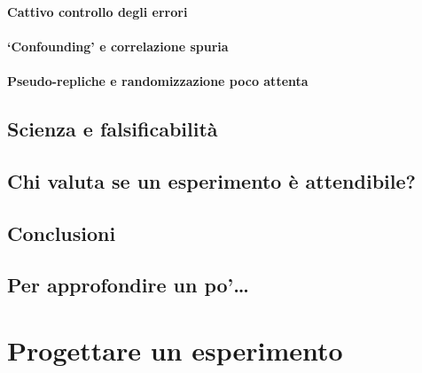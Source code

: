 \documentclass[a4paper,12pt,oneside]{book}
\begin{document}
\hypertarget{cattivo-controllo-degli-errori}{%
\subsubsection{Cattivo controllo degli errori}\label{cattivo-controllo-degli-errori}}

\hypertarget{confounding-e-correlazione-spuria}{%
\subsubsection{`Confounding' e correlazione spuria}\label{confounding-e-correlazione-spuria}}

\hypertarget{pseudo-repliche-e-randomizzazione-poco-attenta}{%
\subsubsection{Pseudo-repliche e randomizzazione poco attenta}\label{pseudo-repliche-e-randomizzazione-poco-attenta}}

\hypertarget{scienza-e-falsificabilita}{%
\section{Scienza e falsificabilità}\label{scienza-e-falsificabilita}}

\hypertarget{chi-valuta-se-un-esperimento-e-attendibile}{%
\section{Chi valuta se un esperimento è attendibile?}\label{chi-valuta-se-un-esperimento-e-attendibile}}

\hypertarget{conclusioni}{%
\section{Conclusioni}\label{conclusioni}}

\hypertarget{per-approfondire-un-po}{%
\section{Per approfondire un po'\ldots{}}\label{per-approfondire-un-po}}

\hypertarget{progettare-un-esperimento}{%
\chapter{Progettare un esperimento}\label{progettare-un-esperimento}}
\end{document}
